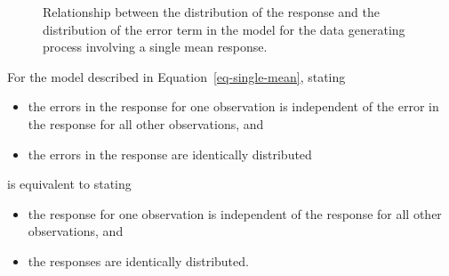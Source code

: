 \documentclass[
  letterpaper,
  DIV=11,
  numbers=noendperiod]{scrreprt}
\providecommand{\tightlist}{%
  \setlength{\itemsep}{0pt}\setlength{\parskip}{0pt}}\usepackage{longtable,booktabs,array}
\theoremstyle{plain}
\theoremstyle{definition}
\theoremstyle{definition}
\theoremstyle{remark}
\begin{document}
\begin{figure}


\caption{\label{fig-meanmodels-shift}Relationship between the
distribution of the response and the distribution of the error term in
the model for the data generating process involving a single mean
response.}

\end{figure}%

\begin{tcolorbox}[enhanced jigsaw, breakable, titlerule=0mm, colframe=quarto-callout-note-color-frame, bottomtitle=1mm, opacityback=0, rightrule=.15mm, toptitle=1mm, arc=.35mm, bottomrule=.15mm, left=2mm, title=\textcolor{quarto-callout-note-color}{\faInfo}\hspace{0.5em}{Note}, leftrule=.75mm, coltitle=black, toprule=.15mm, colbacktitle=quarto-callout-note-color!10!white, colback=white, opacitybacktitle=0.6]

For the model described in Equation~\ref{eq-single-mean}, stating

\begin{itemize}
\tightlist
\item
  the errors in the response for one observation is independent of the
  error in the response for all other observations, and
\item
  the errors in the response are identically distributed
\end{itemize}

is equivalent to stating

\begin{itemize}
\tightlist
\item
  the response for one observation is independent of the response for
  all other observations, and
\item
  the responses are identically distributed.
\end{itemize}

\end{tcolorbox}
\end{document}
